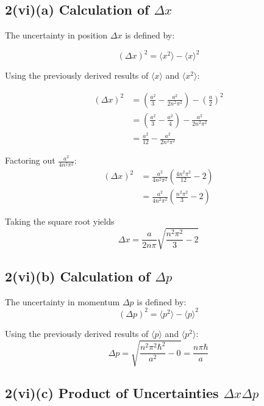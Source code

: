 \documentclass{article}
\begin{document}
\subsection*{2(vi)(a) Calculation of $\Delta x$}

The uncertainty in position $\Delta x$ is defined by:

\begin{equation*}
(\Delta x)^2 = \langle x^2 \rangle - \langle x \rangle^2
\end{equation*}

Using the previously derived results of $\langle x \rangle$ and $\langle x^2 \rangle$:

\begin{align*}
(\Delta x)^2 &= \left( \frac{a^2}{3} - \frac{a^2}{2n^2\pi^2} \right) - \left( \frac{a}{2} \right)^2 \\
&= \left( \frac{a^2}{3} - \frac{a^2}{4} \right) - \frac{a^2}{2n^2\pi^2} \\
&= \frac{a^2}{12} - \frac{a^2}{2n^2\pi^2}
\end{align*}

Factoring out $\frac{a^2}{4n^2\pi^2}$:
\begin{align*}
(\Delta x)^2 &= \frac{a^2}{4n^2\pi^2} \left( \frac{4n^2\pi^2}{12} - 2 \right) \\
&= \frac{a^2}{4n^2\pi^2} \left( \frac{n^2\pi^2}{3} - 2 \right)
\end{align*}

Taking the square root yields
\begin{equation*}
\Delta x = \frac{a}{2n\pi} \sqrt{\frac{n^2\pi^2}{3} - 2}
\end{equation*}

\subsection*{2(vi)(b) Calculation of $\Delta p$}

The uncertainty in momentum $\Delta p$ is defined by:
\begin{equation*}
(\Delta p)^2 = \langle p^2 \rangle - \langle p \rangle^2
\end{equation*}

Using the previously derived results of $\langle p \rangle$ and $\langle p^2 \rangle$:
\begin{equation*}
\Delta p = \sqrt{\frac{n^2\pi^2\hbar^2}{a^2} - 0} = \frac{n\pi\hbar}{a}
\end{equation*}

\subsection*{2(vi)(c) Product of Uncertainties $\Delta x \Delta p$}
\end{document}
